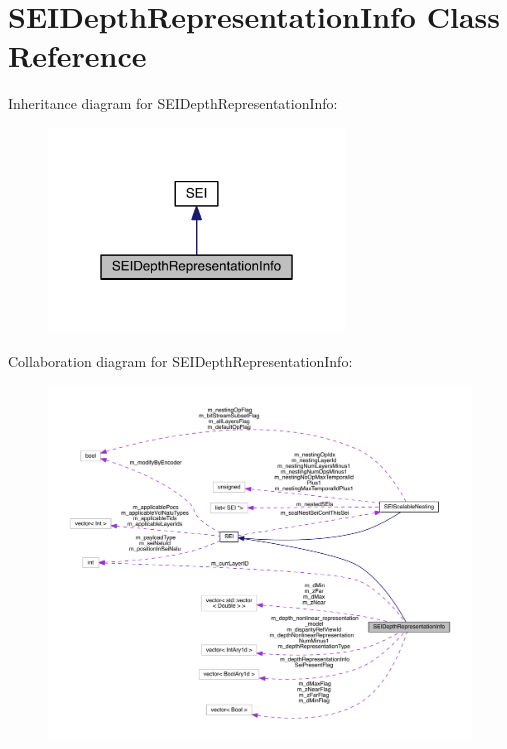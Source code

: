 \hypertarget{class_s_e_i_depth_representation_info}{}\section{S\+E\+I\+Depth\+Representation\+Info Class Reference}
\label{class_s_e_i_depth_representation_info}


Inheritance diagram for S\+E\+I\+Depth\+Representation\+Info\+:
\nopagebreak
\begin{figure}[H]
\begin{center}
\leavevmode
\includegraphics[width=223pt]{de/d3b/class_s_e_i_depth_representation_info__inherit__graph}
\end{center}
\end{figure}


Collaboration diagram for S\+E\+I\+Depth\+Representation\+Info\+:
\nopagebreak
\begin{figure}[H]
\begin{center}
\leavevmode
\includegraphics[width=350pt]{da/d8c/class_s_e_i_depth_representation_info__coll__graph}
\end{center}
\end{figure}
